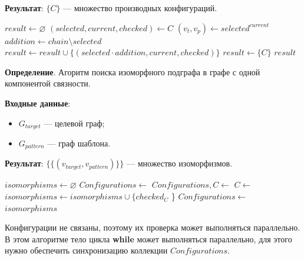 \textbf{Результат}: $\{ C \}$ --- множество производных конфигураций.

\begin{algorithmic}
\State $result \gets \varnothing$
\State $(selected, current, checked) \gets C$
\State $(v_t, v_p) \gets selected^{current}$
    \State $addition \gets chain \setminus selected$
        \State $result \gets result \cup \{ (selected \cdot addition, current, checked) \}$
    \EndIf
\EndFor
{}
    \State $result \gets \{ C \}$
\EndIf
\State \Return $result$
\EndFunction
\end{algorithmic}

\textbf{Определение}. Агоритм поиска изоморфного подграфа в графе с одной
компонентой связности.

\textbf{Входные данные}:
\begin{itemize}
\item $G_{target}$ --- целевой граф;
\item $G_{pattern}$ --- граф шаблона.
\end{itemize}

\textbf{Результат}: $\{ \{ ( v_{target}, v_{pattern} ) \} \}$ --- множество
изоморфизмов.

\begin{algorithmic}
    \State $isomorphisms \gets \varnothing$
    \State $Configurations \gets$ 
        \State $Configurations, C \gets$ 
        \State $C \gets$ 
                \State $isomorphisms \gets isomorphisms \cup \{ checked_C$ \}
            \EndIf
        \Else
            \State $Configurations \gets$ 
        \EndIf
    \EndWhile
    \State \Return $isomorphisms$
\EndFunction
\end{algorithmic}

Конфигурации не связаны, поэтому их проверка может выполняться параллельно.
В этом алгоритме тело цикла \textbf{while} может выполняться параллельно,
для этого нужно обеспечить синхронизацию коллекции $Configurations$.

